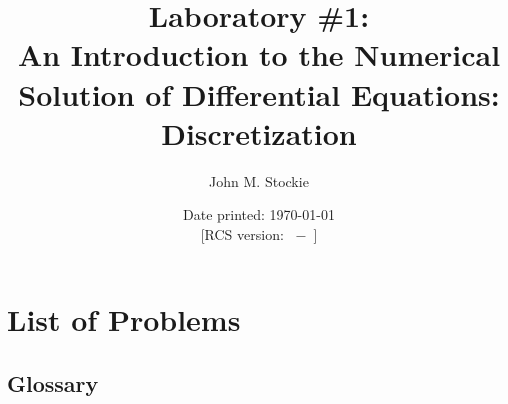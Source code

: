 \documentclass{article}
\title{Laboratory \#1:\\
  An Introduction to the Numerical Solution of
  Differential Equations: Discretization
}
\author{John M. Stockie}
\date{Date printed: \today \\
{\footnotesize [RCS version: \RCSRevision\ $-$\ \RCSDate]}
}
\begin{document}

\newcommand{\ie}{i.e.~}
\newcommand{\eg}{e.g.~}
\newcommand{\dt}{\mbox{$\Delta t$}{}}
\newcommand{\yi}{\mbox{$y_i$}{}}
\newcommand{\ti}{\mbox{$t_i$}{}}
\newcommand{\eqref}[1]{(\ref{#1})}


\maketitle
\tableofcontents

\section*{List of Problems}









\appendix








\begin{latexonly}
 \newpage
 \section*{Glossary}
  \def\g#1{\goodbreak\vskip0pt plus .5pt\vskip0.5\baselineskip\par\noindent{\bf #1: }\ignorespaces}
  
\end{latexonly}
\printindex
\end{document}
